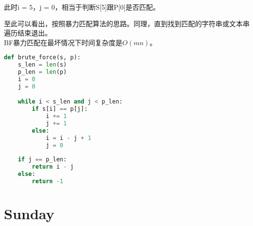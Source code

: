 此时i = 5，j = 0，相当于判断S[5]跟P[0]是否匹配。

\begin{table}[H]
	\centering
\end{table}

至此可以看出，按照暴力匹配算法的思路。同理，直到找到匹配的字符串或文本串遍历结束退出。\\

BF暴力匹配在最坏情况下时间复杂度是$ O(mn) $。\\


\begin{lstlisting}[language=Python]
def brute_force(s, p):
    s_len = len(s)
    p_len = len(p)
    i = 0
    j = 0

    while i < s_len and j < p_len:
        if s[i] == p[j]:
            i += 1
            j += 1
        else:
            i = i - j + 1
            j = 0
    
    if j == p_len:
        return i - j
    else:
        return -1
\end{lstlisting}

\newpage

\section{Sunday}

